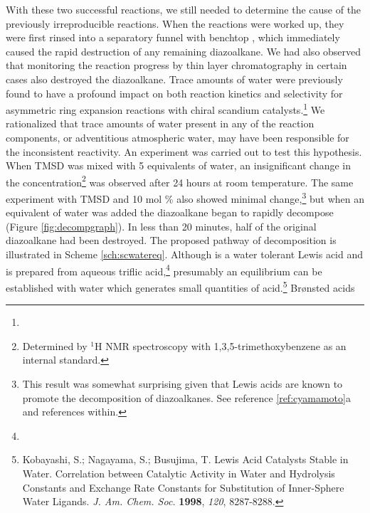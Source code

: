 With these two successful reactions, we still needed to determine the cause of
the previously irreproducible reactions. When the reactions were worked
up, they were first rinsed into a separatory funnel with benchtop , which
immediately caused the rapid destruction of any remaining diazoalkane. We had
also observed that monitoring the reaction progress by thin layer chromatography
in certain cases also destroyed the diazoalkane. Trace amounts of water were
previously found to have a profound impact on both reaction kinetics and selectivity for asymmetric ring expansion reactions with chiral scandium catalysts.\footnote{} We rationalized that trace amounts of
water present in any of the reaction components, or adventitious atmospheric
water, may have been responsible for the inconsistent reactivity. An experiment was carried out to
test this hypothesis. When TMSD was mixed with 5 equivalents of water, an insignificant change in
the concentration\footnote{Determined by $^1$H NMR spectroscopy with
1,3,5-trimethoxybenzene as an internal standard.} was observed after 24
hours at room temperature. The same experiment with TMSD and 10 mol
\%  also showed minimal change,\footnote{This result was
somewhat surprising given that Lewis acids are known to promote the
decomposition of diazoalkanes. See reference \ref{ref:cyamamoto}a and references
within.} but when an equivalent of water was added the diazoalkane began to
rapidly decompose (Figure \ref{fig:decompgraph}). In less than 20 minutes, half of the original
diazoalkane had been destroyed. The proposed pathway of decomposition is illustrated in Scheme
\ref{sch:scwatereq}.
Although  is a water tolerant Lewis acid and is prepared from aqueous
triflic acid,\footnote{} presumably an equilibrium can be
established with water which generates small quantities of acid.\footnote{{\frenchspacing Kobayashi,
S.; Nagayama, S.; Busujima, T.
Lewis Acid Catalysts Stable in Water. Correlation between Catalytic Activity in Water and Hydrolysis Constants and Exchange Rate
Constants for Substitution of Inner-Sphere Water Ligands. \textit{J. Am. Chem. Soc.} \textbf{1998},
\textit{120}, 8287-8288.}}  Br{\o}nsted acids
